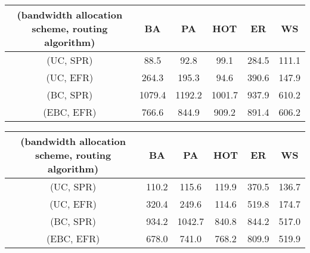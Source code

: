 \documentclass[journal]{IEEEtran}
\begin{document}
{\begin{table*}[!t]
\begin{tabular}{c|ccccc}
(bandwidth allocation scheme, routing algorithm) & BA & PA & HOT &
ER
&WS\\
\hline \hline

(UC, SPR) & 88.5   & 92.8   & 99.1   & 284.5 & 111.1\\
(UC, EFR) & 264.3  & 195.3  & 94.6   & 390.6 & 147.9\\
(BC, SPR) & 1079.4 & 1192.2 & 1001.7 & 937.9 & 610.2\\
(EBC, EFR)& 766.6  & 844.9  & 909.2  & 891.4 & 606.2 \\
 \hline
\end{tabular}
\end{table*}


\begin{table*}[!t]
\renewcommand{\arraystretch}{1.3}
\centering \caption{Simulation result of the critical
packet-generating rate  under different combinations for BA,
PA, HOT, ER and WS networks. For each kind of network, 10 instances
are generated and for each instance, we run ten simulations. The
result here is the average over all the simulations. Compared with
Table \ref{simulation_result}, it is shown that the simulation
result is roughly consistent with the theoretical analysis. }
\label{simulation_result}
\begin{tabular}{c|ccccc}
\hline

(bandwidth allocation scheme, routing algorithm) & BA & PA & HOT & ER &WS\\
\hline \hline

(UC, SPR)  & 110.2 & 115.6  & 119.9  & 370.5 & 136.7 \\
(UC, EFR)  & 320.4 & 249.6  & 114.6  & 519.8 & 174.7 \\
 (BC, SPR) & 934.2 & 1042.7 & 840.8  & 844.2 & 517.0 \\
 (EBC, EFR)& 678.0 & 741.0  & 768.2  & 809.9 & 519.9 \\
 \hline
\end{tabular}
\end{table*}


\begin{table*}[!t]
\centering \caption{ under different combinations of
network topologies, routing algorithms and bandwidth allocation
schemes. It is evident that betweenness based link bandwidth
allocation scheme often incurs high , especially for
heterogenous networks. Although (EBC,EFR) can assure much lower
 for BA-like scale-free networks, the reduction is not
apparent for HOT network. }  \label{max_capability}
\begin{tabular}{c|ccccc}
\hline


\end{tabular}
\end{table*}}
\end{document}
